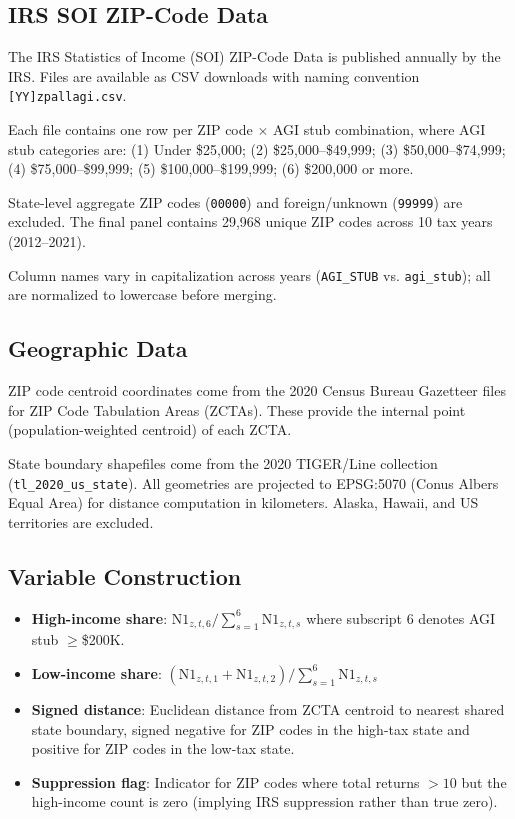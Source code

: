 \documentclass[12pt]{article}
\begin{document}
\subsection{IRS SOI ZIP-Code Data}

The IRS Statistics of Income (SOI) ZIP-Code Data is published annually by the IRS. Files are available as CSV downloads with naming convention \texttt{[YY]zpallagi.csv}.

Each file contains one row per ZIP code $\times$ AGI stub combination, where AGI stub categories are: (1) Under \$25,000; (2) \$25,000--\$49,999; (3) \$50,000--\$74,999; (4) \$75,000--\$99,999; (5) \$100,000--\$199,999; (6) \$200,000 or more.

State-level aggregate ZIP codes (\texttt{00000}) and foreign/unknown (\texttt{99999}) are excluded. The final panel contains 29,968 unique ZIP codes across 10 tax years (2012--2021).

Column names vary in capitalization across years (\texttt{AGI\_STUB} vs. \texttt{agi\_stub}); all are normalized to lowercase before merging.

\subsection{Geographic Data}

ZIP code centroid coordinates come from the 2020 Census Bureau Gazetteer files for ZIP Code Tabulation Areas (ZCTAs). These provide the internal point (population-weighted centroid) of each ZCTA.

State boundary shapefiles come from the 2020 TIGER/Line collection (\texttt{tl\_2020\_us\_state}). All geometries are projected to EPSG:5070 (Conus Albers Equal Area) for distance computation in kilometers. Alaska, Hawaii, and US territories are excluded.

\subsection{Variable Construction}

\begin{itemize}
\item \textbf{High-income share}: $\text{N1}_{z,t,6} / \sum_{s=1}^{6} \text{N1}_{z,t,s}$ where subscript 6 denotes AGI stub $\geq$\$200K.
\item \textbf{Low-income share}: $(\text{N1}_{z,t,1} + \text{N1}_{z,t,2}) / \sum_{s=1}^{6} \text{N1}_{z,t,s}$
\item \textbf{Signed distance}: Euclidean distance from ZCTA centroid to nearest shared state boundary, signed negative for ZIP codes in the high-tax state and positive for ZIP codes in the low-tax state.
\item \textbf{Suppression flag}: Indicator for ZIP codes where total returns $> 10$ but the high-income count is zero (implying IRS suppression rather than true zero).
\end{itemize}
\end{document}
